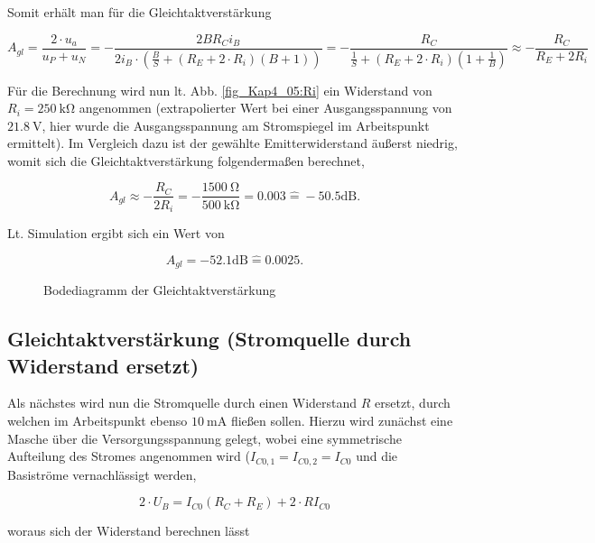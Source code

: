 Somit erhält man für die Gleichtaktverstärkung

\begin{equation}
    A_{gl} = \frac{2 \cdot u_a}{u_P + u_N} = -\frac{2BR_Ci_B}{2 i_B \cdot \left( \frac{B}{S} + (R_E + 2 \cdot R_i)(B+1) \right)} = - \frac{R_C}{\frac{1}{S} + (R_E + 2 \cdot R_i)(1+\frac{1}{B})} \approx -\frac{R_C}{R_E + 2R_i}
\end{equation}

Für die Berechnung wird nun lt. Abb. \ref{fig_Kap4_05:Ri} ein Widerstand von $R_i = \SI{250}{\kilo\ohm}$ angenommen (extrapolierter Wert bei einer Ausgangsspannung von $\SI{21,8}{\volt}$, hier wurde die Ausgangsspannung am Stromspiegel im Arbeitspunkt ermittelt). Im Vergleich dazu ist der gewählte Emitterwiderstand äußerst niedrig, womit sich die Gleichtaktverstärkung folgendermaßen berechnet, 

\begin{equation}
    A_{gl} \approx -\frac{R_C}{2R_i} = -\frac{\SI{1500}{\ohm}}{\SI{500}{\kilo\ohm}} = 0.003 \hat{=} -50.5 \text{dB} .
\end{equation}

Lt. Simulation ergibt sich ein Wert von 

\begin{equation}
    A_{gl} =-52.1 \text{dB} \hat{=} 0.0025 .
\end{equation}

\begin{figure}[H]
	\centering \small
	\scalebox{0.9}{}
	\caption{Bodediagramm der Gleichtaktverstärkung}
	\label{fig_Kap5_05:Bode}
\end{figure}

\subsection{Gleichtaktverstärkung (Stromquelle durch Widerstand ersetzt)}
Als nächstes wird nun die Stromquelle durch einen Widerstand $R$ ersetzt, durch welchen im Arbeitspunkt ebenso $\SI{10}{\milli\ampere}$ fließen sollen. Hierzu wird zunächst eine Masche über die Versorgungsspannung gelegt, wobei eine symmetrische Aufteilung des Stromes angenommen wird ($I_{C0,1} = I_{C0,2} = I_{C0}$ und die Basiströme vernachlässigt werden,

\begin{equation}
    2\cdot U_B = I_{C0} (R_C + R_E) + 2 \cdot RI_{C0}
\end{equation}

woraus sich der Widerstand berechnen lässt


